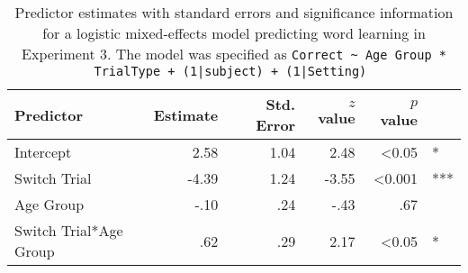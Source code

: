 \begin{table}
\begin{center}
\begin{tabular}{lrrrrl}
\hline
Predictor & Estimate & Std. Error & $z$ value & $p$ value & \\
\hline
Intercept & 2.58 & 1.04  & 2.48 &  <0.05 & *  \\
Switch Trial  & -4.39 & 1.24  & -3.55 &  <0.001 & ***   \\
Age Group  & -.10 & .24  & -.43 &  .67 &  \\
Switch Trial*Age Group  & .62 & .29 & 2.17 &  <0.05 & *   \\
\hline
\end{tabular}
\end{center}
\caption{\label{tab:exp2_reg}Predictor estimates with standard errors and significance information for a logistic mixed-effects model predicting word learning in Experiment 3. The model was specified as \small{\tt{Correct \textasciitilde \hspace{1pt} Age Group * TrialType + (1|subject) + (1|Setting)} }}
\end{table}
